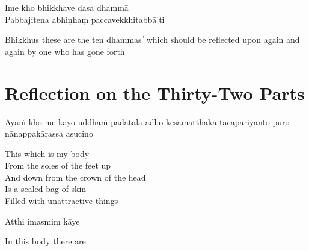 Ime kho bhikkhave dasa dhammā\\
Pabbajitena abhiṇhaṃ paccavekkhitabbā'ti

\begin{english}
  Bhikkhus these are the ten dhammas  ̓  which should be reflected upon again and again by one who has gone forth
\end{english}


\clearpage

\section{Reflection on the Thirty-Two Parts}

\begin{leader}
\end{leader}

Ayaṁ kho me kāyo uddhaṁ pādatalā adho kesamatthakā tacapariyanto pūro nānappakārassa asucino

\begin{english}
  This which is my body\\
  From the soles of the feet up\\
  And down from the crown of the head\\
  Is a sealed bag of skin\\
  Filled with unattractive things
\end{english}

Atthi imasmiṃ kāye

\begin{english}
  In this body there are
\end{english}


